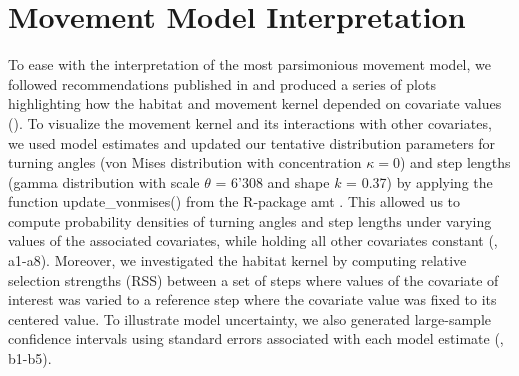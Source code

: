 \documentclass[abstract=off,10pt,a4paper,bibliography=totocnumbered]{article}
\begin{document}
\section{Movement Model Interpretation}
To ease with the interpretation of the most parsimonious movement model, we
followed recommendations published in \cite{Fieberg.2021} and produced a series
of plots highlighting how the habitat and movement kernel depended on covariate
values (). To visualize the movement kernel and its
interactions with other covariates, we used model estimates and updated our
tentative distribution parameters for turning angles (von Mises distribution
with concentration \(\kappa = 0\)) and step lengths (gamma distribution with
scale \(\theta\) = 6'308 and shape \(k\) = 0.37) by applying the function
\textsf{update\_vonmises()} from the R-package \textsf{amt} \citep{Amt.2019}.
This allowed us to compute probability densities of turning angles and step
lengths under varying values of the associated covariates, while holding all
other covariates constant (, a1-a8). Moreover, we
investigated the habitat kernel by computing relative selection strengths (RSS)
between a set of steps where values of the covariate of interest was varied to a
reference step where the covariate value was fixed to its centered value. To
illustrate model uncertainty, we also generated large-sample confidence
intervals using standard errors associated with each model estimate
(, b1-b5).
\end{document}
